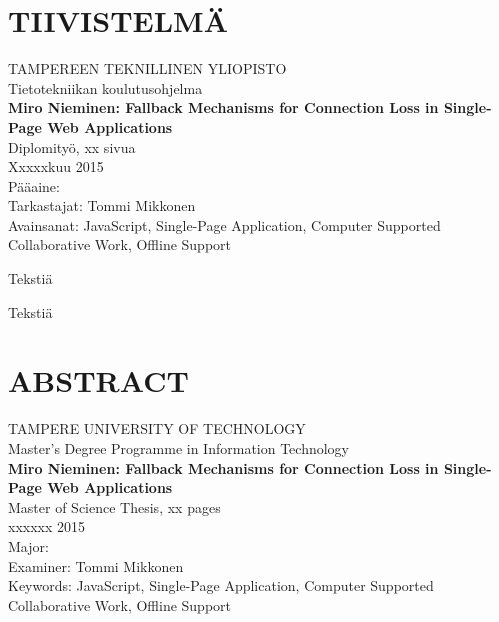 \newpage
 
\setcounter{page}{1} %
 
\chapter*{TIIVISTELMÄ}
\begin{spacing}{1.0}
\textsf{TAMPEREEN TEKNILLINEN YLIOPISTO}\\
\textsf{Tietotekniikan koulutusohjelma}\\
{\bf \textsf{Miro Nieminen: Fallback Mechanisms for Connection Loss in Single-Page Web Applications}}\\
\textsf{Diplomityö, xx sivua}\\
\textsf{Xxxxxkuu 2015}\\
\textsf{Pääaine: }\\
\textsf{Tarkastajat: Tommi Mikkonen}\\
\textsf{Avainsanat: JavaScript, Single-Page Application, Computer Supported Collaborative Work, Offline Support}\\
\end{spacing}
 
\noindent
Tekstiä
 
\noindent
Tekstiä





\newpage
\chapter*{ABSTRACT}
\begin{spacing}{1.0}
\textsf{TAMPERE UNIVERSITY OF TECHNOLOGY}\\
\textsf{Master's Degree Programme in Information Technology}\\
{\bf \textsf{Miro Nieminen: Fallback Mechanisms for Connection Loss in Single-Page Web Applications}}\\
\textsf{Master of Science Thesis, xx pages}\\
\textsf{xxxxxx 2015}\\
\textsf{Major: }\\
\textsf{Examiner: Tommi Mikkonen}\\
\textsf{Keywords: JavaScript, Single-Page Application, Computer Supported Collaborative Work, Offline Support}\\
\end{spacing}
 
